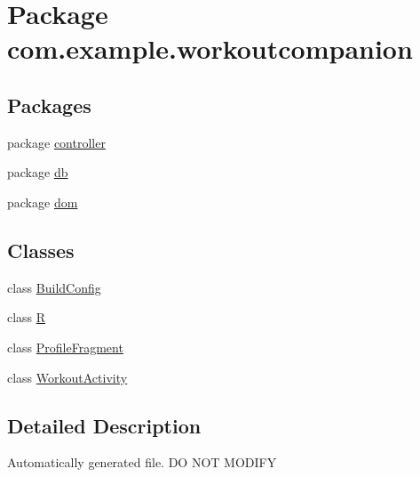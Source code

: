\hypertarget{namespacecom_1_1example_1_1workoutcompanion}{\section{Package com.\-example.\-workoutcompanion}
\label{namespacecom_1_1example_1_1workoutcompanion}
}
\subsection*{Packages}
\begin{DoxyCompactItemize}
\item 
package \hyperlink{namespacecom_1_1example_1_1workoutcompanion_1_1controller}{controller}
\item 
package \hyperlink{namespacecom_1_1example_1_1workoutcompanion_1_1db}{db}
\item 
package \hyperlink{namespacecom_1_1example_1_1workoutcompanion_1_1dom}{dom}
\end{DoxyCompactItemize}
\subsection*{Classes}
\begin{DoxyCompactItemize}
\item 
class \hyperlink{classcom_1_1example_1_1workoutcompanion_1_1_build_config}{Build\-Config}
\item 
class \hyperlink{classcom_1_1example_1_1workoutcompanion_1_1_r}{R}
\item 
class \hyperlink{classcom_1_1example_1_1workoutcompanion_1_1_profile_fragment}{Profile\-Fragment}
\item 
class \hyperlink{classcom_1_1example_1_1workoutcompanion_1_1_workout_activity}{Workout\-Activity}
\end{DoxyCompactItemize}


\subsection{Detailed Description}
Automatically generated file. D\-O N\-O\-T M\-O\-D\-I\-F\-Y 